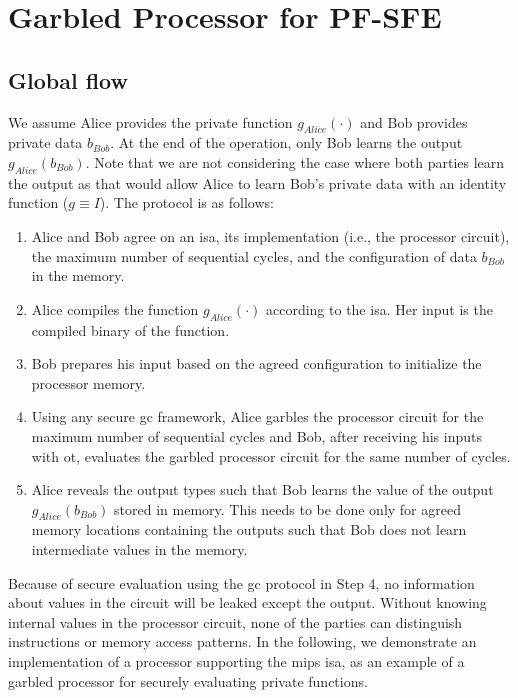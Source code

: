 \section{Garbled Processor for PF-SFE} \label{sec:processor-pro-pfsfe}
\subsection{Global flow}\label{ssec:processor-mips-flow}
We assume Alice provides the private function $g_{Alice}(\cdot)$ and Bob provides private data $b_{Bob}$.
At the end of the operation, only Bob learns the output $g_{Alice}(b_{Bob})$.
Note that we are not considering the case where both parties learn the output as that would allow Alice to learn Bob's private data with an identity function ($g\equiv I$).
The protocol is as follows:

\begin{enumerate}
\item
  Alice and Bob agree on an \acrfull{isa}, its implementation (i.e., the processor circuit), the maximum number of sequential cycles, and the configuration of data $b_{Bob}$ in the memory.
\item
  Alice compiles the function $g_{Alice}(\cdot)$ according to the \acrshort{isa}.
  Her input is the compiled binary of the function.
\item
  Bob prepares his input based on the agreed configuration to initialize the processor memory.
\item
  Using any secure \acrshort{gc} framework, Alice garbles the processor circuit for the maximum number of sequential cycles and Bob, after receiving his inputs with \acrshort{ot}, evaluates the garbled processor circuit for the same number of cycles.

\item
  Alice reveals the output types such that Bob learns the value of the output $g_{Alice}(b_{Bob})$ stored in memory.
  This needs to be done only for agreed memory locations containing the outputs such that Bob does not learn intermediate values in the memory.
\end{enumerate}

Because of secure evaluation using the \acrshort{gc} protocol in Step 4, no information about values in the circuit will be leaked except the output.
Without knowing internal values in the processor circuit, none of the parties can distinguish instructions or memory access patterns.
In the following, we demonstrate an implementation of a processor supporting the \gls{mips} \acrshort{isa}, as an example of a garbled processor for securely evaluating private functions.

